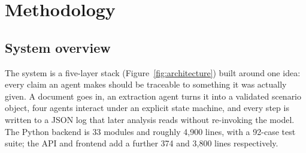 \chapter{Methodology}
\label{ch:methodology}

\section{System overview}
\label{sec:overview}

The system is a five-layer stack (Figure~\ref{fig:architecture}) built around one
idea: every claim an agent makes should be traceable to something it was actually
given. A document goes in, an extraction agent turns it into a validated scenario
object, four agents interact under an explicit state machine, and every step is
written to a JSON log that later analysis reads without re-invoking the model. The
Python backend is 33 modules and roughly 4,900 lines, with a 92-case test suite;
the API and frontend add a further 374 and 3,800 lines respectively.

